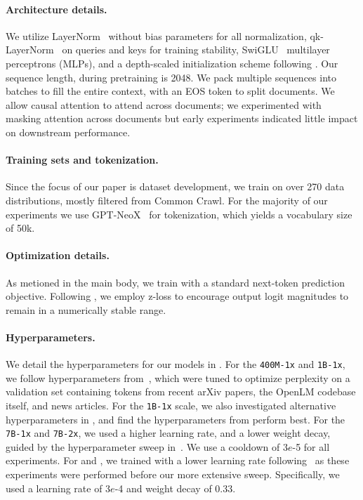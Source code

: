 \documentclass{article}
\newcommand{\xstrack}{\texttt{400M-1x}\xspace}
\newcommand{\strack}{\texttt{1B-1x}\xspace}
\newcommand{\ltrack}{\texttt{7B-1x}\xspace}
\newcommand{\xltrack}{\texttt{7B-2x}\xspace}
\newcommand{\commoncrawl}{Common Crawl\xspace}
\begin{document}
\paragraph{Architecture details.}
We utilize LayerNorm~\citep{ba2016layer} without bias parameters for all normalization, qk-LayerNorm~\citep{dehghani2023scaling} on queries and keys for training stability, SwiGLU~\citep{swiglu} multilayer perceptrons (MLPs), and a depth-scaled initialization scheme following \citet{zhang-etal-2019-improving}.
Our sequence length, during pretraining is 2048.
We pack multiple sequences into batches to fill the entire context, with an EOS token to split documents.
We allow causal attention to attend across documents; we experimented with masking attention across documents but early experiments indicated little impact on downstream performance.

\paragraph{Training sets and tokenization.}
Since the focus of our paper is dataset development, we train on over 270 data distributions, mostly filtered from \commoncrawl.
For the majority of our experiments we use GPT-NeoX~\citep{neox} for tokenization, which yields a vocabulary size of 50k.

\paragraph{Optimization details.}
As metioned in the main body, we train with a standard next-token prediction objective. Following \citet{Chowdhery2022PaLMSL}, we employ z-loss to encourage output logit magnitudes to remain in a numerically stable range.

\paragraph{Hyperparameters.}
We detail the hyperparameters for our models in .
For the \xstrack{} and \strack{}, we follow hyperparameters from~\citep{gadre2024LanguageMS}, which were tuned to optimize perplexity on a validation set containing tokens from recent arXiv papers, the OpenLM codebase itself, and news articles.
For the \strack{} scale, we also investigated alternative hyperparameters in , and find the hyperparameters from \citep{gadre2024LanguageMS} perform best.
For the \ltrack{} and \xltrack{}, we used a higher learning rate, and a lower weight decay, guided by the hyperparameter sweep in~.
We use a cooldown of 3$e$-5 for all experiments.
For  and , we trained with a lower learning rate following~\citep{gadre2024LanguageMS} as these experiments were performed before our more extensive sweep. Specifically, we used a learning rate of 3$e$-4 and weight decay of 0.33.
\end{document}
